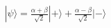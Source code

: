 \documentclass[preview]{standalone}
\begin{document}
\begin{align*}
|\psi\rangle = \frac{\alpha + \beta}{\sqrt{2}} |+\rangle + \frac{\alpha - \beta}{\sqrt{2}} |-\rangle
\end{align*}
\end{document}

